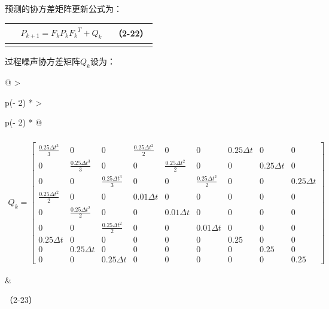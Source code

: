 预测的协方差矩阵更新公式为：

{\def\LTcaptype{none} %
\begin{longtable}[]{@{}
  >{\raggedright\arraybackslash}p{}
  >{\raggedright\arraybackslash}p{}
  >{\raggedright\arraybackslash}p{}@{}}
\toprule\noalign{}
\begin{minipage}[b]{\linewidth}\centering
\end{minipage} & \begin{minipage}[b]{\linewidth}\centering
\[\begin{array}{r}
P_{k + 1} = F_{k}P_{k}{F_{k}}^{T} + Q_{k}
\end{array}\]
\end{minipage} & \begin{minipage}[b]{\linewidth}\raggedleft
（2-22）
\end{minipage} \\
\midrule\noalign{}
\endhead
\bottomrule\noalign{}
\endlastfoot
\end{longtable}
}

过程噪声协方差矩阵\(Q_{k}\)设为：

{\def\LTcaptype{none} %
\begin{longtable}[]{@{}
  >{\raggedright\arraybackslash}p{}
  >{\raggedright\arraybackslash}p{}@{}}
\toprule\noalign{}
\begin{minipage}[b]{\linewidth}\centering
\[\begin{array}{r}
\  \\
Q_{k} = \begin{bmatrix}
\frac{0.25\Delta t^{3}}{3} & 0 & 0 & \frac{0.25\Delta t^{2}}{2} & 0 & 0 & 0.25\Delta t & 0 & 0 \\
0 & \frac{0.25\Delta t^{3}}{3} & 0 & 0 & \frac{0.25\Delta t^{2}}{2} & 0 & 0 & 0.25\Delta t & 0 \\
0 & 0 & \frac{0.25\Delta t^{3}}{3} & 0 & 0 & \frac{0.25\Delta t^{2}}{2} & 0 & 0 & 0.25\Delta t \\
\frac{0.25\Delta t^{2}}{2} & 0 & 0 & 0.01\Delta t & 0 & 0 & 0 & 0 & 0 \\
0 & \frac{0.25\Delta t^{2}}{2} & 0 & 0 & 0.01\Delta t & 0 & 0 & 0 & 0 \\
0 & 0 & \frac{0.25\Delta t^{2}}{2} & 0 & 0 & 0.01\Delta t & 0 & 0 & 0 \\
0.25\Delta t & 0 & 0 & 0 & 0 & 0 & 0.25 & 0 & 0 \\
0 & 0.25\Delta t & 0 & 0 & 0 & 0 & 0 & 0.25 & 0 \\
0 & 0 & 0.25\Delta t & 0 & 0 & 0 & 0 & 0 & 0.25
\end{bmatrix}
\end{array}\]
\end{minipage} & \begin{minipage}[b]{\linewidth}\raggedleft
（2-23）
\end{minipage} \\
\midrule\noalign{}
\endhead
\bottomrule\noalign{}
\endlastfoot
\end{longtable}
}

